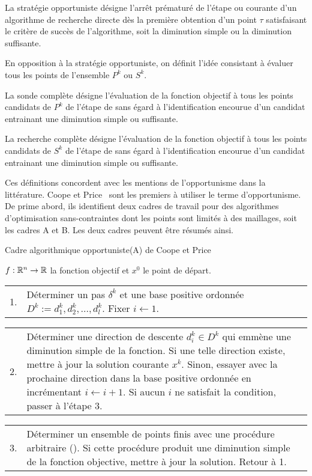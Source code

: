 \begin{definition}
La stratégie opportuniste désigne l'arrêt prématuré de l'étape \SEARCH ou \POLL courante d'un algorithme de recherche directe dès la première obtention d'un point $\tau$ satisfaisant le critère de succès de l'algorithme, soit la diminution simple ou la diminution suffisante.
\end{definition}
En opposition à la stratégie opportuniste, on définit l'idée consistant à évaluer tous les points de l'ensemble $P^k$ ou $S^k$.
\begin{definition}
La sonde complète désigne l'évaluation de la fonction objectif à tous les points candidats de $P^k$ de l'étape de \POLL sans égard à l'identification encourue d'un candidat entrainant une diminution simple ou suffisante. 

La recherche complète désigne l'évaluation de la fonction objectif à tous les points candidats de $S^k$ de l'étape de \SEARCH sans égard à l'identification encourue d'un candidat entrainant une diminution simple ou suffisante. 
\end{definition}
Ces définitions concordent avec les mentions de l'opportunisme dans la littérature. Coope et Price~\cite{CoPr01a} sont les premiers à utiliser le terme d'opportunisme. De prime abord, ils identifient deux cadres de travail pour des algorithmes d'optimisation sans-contraintes dont les points sont limités à des maillages, soit les cadres A et B. Les deux cadres peuvent être résumés ainsi.
\begin{algorithm}[H]
	\caption{\textsf{Cadre algorithmique opportuniste(A) de Coope et Price}}
	\label{A}
	\begin{algorithmic}
	\STATE $f:\mathbb{R}^n\rightarrow \mathbb{R}$ la fonction objectif et $x^0$ le point de départ.
	\STATE \begin{tabularx}{440pt}{l X}1. & Déterminer un pas $\delta ^k$ et une base positive ordonnée $D^k:={d_1^k,d_2^k,\dots,d^k_l}$. Fixer $i \leftarrow 1$.\end{tabularx}
	\STATE \begin{tabularx}{440pt}{l X}2. & Déterminer une direction de descente $d_i^k\in D^k$ qui emmène une diminution simple de la fonction. Si une telle direction existe, mettre à jour la solution courante $x^k$. Sinon, essayer avec la prochaine direction dans la base positive ordonnée en incrémentant $i\leftarrow i+1$. Si aucun $i$ ne satisfait la condition, passer à l'étape 3.\end{tabularx}
	\STATE \begin{tabularx}{440pt}{l X}3. & Déterminer un ensemble de points finis avec une procédure arbitraire (\SEARCH). Si cette procédure produit une diminution simple de la fonction objective, mettre à jour la solution. Retour à 1.\end{tabularx}
	\end{algorithmic}
\end{algorithm}
